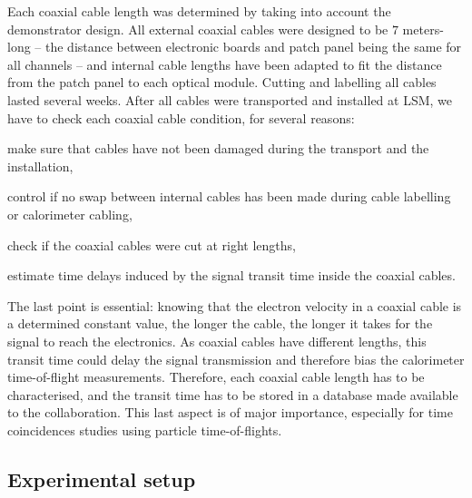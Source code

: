 Each coaxial cable length was determined by taking into account the demonstrator design.
All external coaxial cables were designed to be $7$ meters-long -- the distance between electronic boards and patch panel being the same for all channels -- and internal cable lengths have been adapted to fit the distance from the patch panel to each optical module.
Cutting and labelling all cables lasted several weeks.
After all cables were transported and installed at LSM, we have to check each coaxial cable condition, for several reasons:
\begin{itemize*}
\item make sure that cables have not been damaged during the transport and the installation,
\item control if no swap between internal cables has been made during cable labelling or calorimeter cabling,
\item check if the coaxial cables were cut at right lengths,
\item estimate time delays induced by the signal transit time inside the coaxial cables.
\end{itemize*}
The last point is essential: knowing that the  electron velocity in a coaxial cable is a determined constant value, the longer the cable, the longer it takes for the signal to reach the electronics.
As coaxial cables have different lengths, this transit time could delay the signal transmission and therefore bias the calorimeter time-of-flight measurements.
Therefore, each coaxial cable length has to be characterised, and the transit time has to be stored in a database made available to the collaboration.
This last aspect is of major importance, especially for time coincidences studies using particle time-of-flights.

\subsection{Experimental setup}

